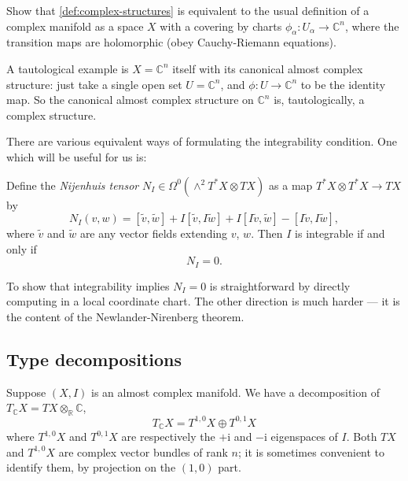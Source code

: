 \documentclass[12pt,letterpaper,reqno]{article}
\numberwithin{equation}{section}
\newcommand{\R}{\ensuremath{\mathbb R}}
\newcommand{\C}{\ensuremath{\mathbb C}}
\newcommand{\I}{{\mathrm i}}
\newcommand{\ti}[1]{\textit{#1}}
\begin{document}
\begin{exercise} Show that \autoref{def:complex-structures} is equivalent to the usual definition of a complex manifold as a space
$X$ with a covering by charts $\phi_\alpha: U_\alpha \to \C^n$, where the transition maps are holomorphic (obey Cauchy-Riemann equations).
\end{exercise}

\begin{example}[Complex structure on $\C^n$] A tautological example is $X = \C^n$ itself with its 
canonical almost complex structure: just take a single open set $U = \C^n$, and $\phi: U \to \C^n$ to be the identity map. So the canonical almost complex structure on $\C^n$ is, tautologically, a
complex structure.
\end{example}

There are various equivalent ways of formulating the integrability condition. One which will be useful for us is:
\begin{prop} Define the \ti{Nijenhuis tensor} $N_I \in \Omega^0(\wedge^2 T^*X \otimes TX)$ as a map
$T^*X \otimes T^*X \to TX$ by
\begin{equation}
N_I(v,w) = [\tilde v,\tilde w] + I[\tilde v,I \tilde w] + I[I \tilde v, \tilde w] - [I\tilde v,I\tilde w],
\end{equation}
where $\tilde v$ and $\tilde w$ are any vector fields extending $v$, $w$.
Then $I$ is integrable if and only if
\begin{equation}
N_I = 0.  
\end{equation}
\end{prop}
\begin{pf} To show that integrability implies $N_I = 0$ is straightforward
by directly computing in a local coordinate chart. The other direction
is much harder --- it is the content of the Newlander-Nirenberg theorem.
\end{pf}

\subsection{Type decompositions}
Suppose $(X,I)$ is an almost complex manifold.
We have a decomposition
of $T_\C X = TX \otimes_\R \C$,
\begin{equation}
T_\C X = T^{1,0} X \oplus T^{0,1} X
  \end{equation}
where $T^{1,0} X$ and $T^{0,1} X$ are 
respectively the
$+\I$ and $-\I$ eigenspaces of $I$.
Both $TX$ and $T^{1,0}X$ are complex vector bundles 
of rank $n$; it is sometimes convenient to identify
them, by projection on the $(1,0)$ part.
\end{document}
